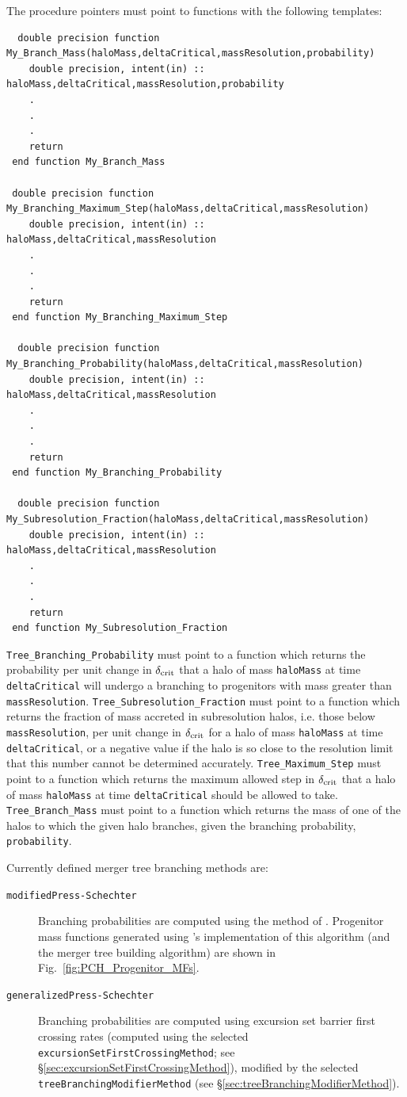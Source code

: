 The procedure pointers must point to functions with the following templates:
\begin{verbatim}
  double precision function My_Branch_Mass(haloMass,deltaCritical,massResolution,probability)
    double precision, intent(in) :: haloMass,deltaCritical,massResolution,probability
    .
    .
    .
    return
 end function My_Branch_Mass

 double precision function My_Branching_Maximum_Step(haloMass,deltaCritical,massResolution)
    double precision, intent(in) :: haloMass,deltaCritical,massResolution
    .
    .
    .
    return
 end function My_Branching_Maximum_Step

  double precision function My_Branching_Probability(haloMass,deltaCritical,massResolution)
    double precision, intent(in) :: haloMass,deltaCritical,massResolution
    .
    .
    .
    return
 end function My_Branching_Probability

  double precision function My_Subresolution_Fraction(haloMass,deltaCritical,massResolution)
    double precision, intent(in) :: haloMass,deltaCritical,massResolution
    .
    .
    .
    return
 end function My_Subresolution_Fraction
\end{verbatim}
{\tt Tree\_Branching\_Probability} must point to a function which returns the probability per unit change in $\delta_{\rm crit}$ that a halo of mass {\tt haloMass} at time {\tt deltaCritical} will undergo a branching to progenitors with mass greater than {\tt massResolution}. {\tt Tree\_Subresolution\_Fraction} must point to a function which returns the fraction of mass accreted in subresolution halos, i.e. those below {\tt massResolution}, per unit change in $\delta_{\rm crit}$ for a halo of mass {\tt haloMass} at time {\tt deltaCritical}, or a negative value if the halo is so close to the resolution limit that this number cannot be determined accurately. {\tt Tree\_Maximum\_Step} must point to a function which returns the maximum allowed step in $\delta_{\rm crit}$ that a halo of mass {\tt haloMass} at time {\tt deltaCritical} should be allowed to take. {\tt Tree\_Branch\_Mass} must point to a function which returns the mass of one of the halos to which the given halo branches, given the branching 
probability, {\tt probability}.

Currently defined merger tree branching methods are:
\begin{description}
 \item [{\tt modifiedPress-Schechter}] Branching probabilities are computed using the method of \cite{parkinson_generating_2008}. Progenitor mass functions generated using \glc's implementation of this algorithm (and the \cite{cole_hierarchical_2000} merger tree building algorithm) are shown in Fig.~\ref{fig:PCH_Progenitor_MFs}.
 \item [{\tt generalizedPress-Schechter}] Branching probabilities are computed using excursion set barrier first crossing rates (computed using the selected {\tt excursionSetFirstCrossingMethod}; see \S\ref{sec:excursionSetFirstCrossingMethod}), modified by the selected {\tt treeBranchingModifierMethod} (see \S\ref{sec:treeBranchingModifierMethod}).
\end{description}

